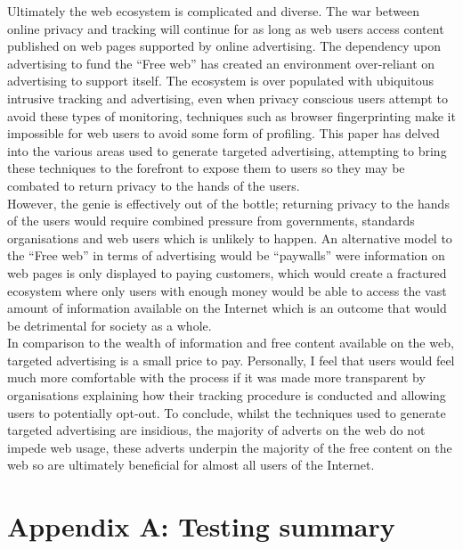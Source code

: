 \documentclass[12pt]{article}
\begin{document}
Ultimately the web ecosystem is complicated and diverse. The war between online privacy and tracking will continue for as long as web users access content published on web pages supported by online advertising. The dependency upon advertising to fund the ``Free web'' has created an environment over-reliant on advertising to support itself. The ecosystem is over populated with ubiquitous intrusive tracking and advertising, even when privacy conscious users attempt to avoid these types of monitoring, techniques such as browser fingerprinting make it impossible for web users to avoid some form of profiling. This paper has delved into the various areas used to generate targeted advertising, attempting to bring these techniques to the forefront to expose them to users so they may be combated to return privacy to the hands of the users. \\

However, the genie is effectively out of the bottle; returning privacy to the hands of the users would require combined pressure from governments, standards organisations and web users which is unlikely to happen. An alternative model to the ``Free web'' in terms of advertising would be ``paywalls'' were information on web pages is only displayed to paying customers, which would create a fractured ecosystem where only users with enough money would be able to access the vast amount of information available on the Internet which is an outcome that would be detrimental for society as a whole. \\

In comparison to the wealth of information and free content available on the web, targeted advertising is a small price to pay. Personally, I feel that users would feel much more comfortable with the process if it was made more transparent by organisations explaining how their tracking procedure is conducted and allowing users to potentially opt-out. To conclude, whilst the techniques used to generate targeted advertising are insidious, the majority of adverts on the web do not impede web usage, these adverts underpin the majority of the free content on the web so are ultimately beneficial for almost all users of the Internet.

\section{Appendix A: Testing summary} \label{testSummary}
\end{document}
